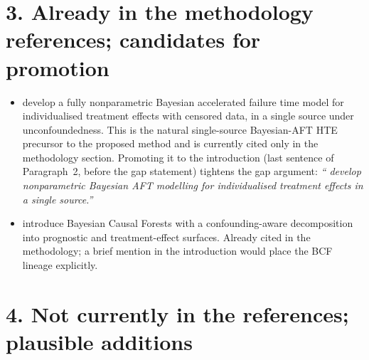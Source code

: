 \documentclass[11pt]{article}
\begin{document}
\section*{3. Already in the methodology references; candidates for promotion}

\begin{itemize}
  \item \citet{henderson2020individualized} develop a fully nonparametric Bayesian accelerated failure time model for individualised treatment effects with censored data, in a single source under unconfoundedness. This is the natural single-source Bayesian-AFT HTE precursor to the proposed method and is currently cited only in the methodology section. Promoting it to the introduction (last sentence of Paragraph~2, before the gap statement) tightens the gap argument: \emph{``\citet{henderson2020individualized} develop nonparametric Bayesian AFT modelling for individualised treatment effects in a single source.''}
  \item \citet{hahn2020bayesian} introduce Bayesian Causal Forests with a confounding-aware decomposition into prognostic and treatment-effect surfaces. Already cited in the methodology; a brief mention in the introduction would place the BCF lineage explicitly.
\end{itemize}

\section*{4. Not currently in the references; plausible additions}
\end{document}
